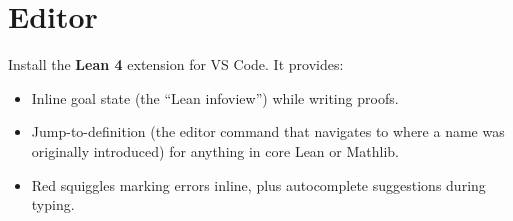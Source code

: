 \section{Editor}\label{sec:00-setup:03-editor:1}

Install the \textbf{Lean 4} extension for VS Code. It provides:

\begin{itemize}
\tightlist
\item
  Inline goal state (the ``Lean infoview'') while writing proofs.
\item
  Jump-to-definition (the editor command that navigates to where a name was originally introduced) for anything in core Lean or Mathlib.
\item
  Red squiggles marking errors inline, plus autocomplete suggestions during typing.
\end{itemize}
